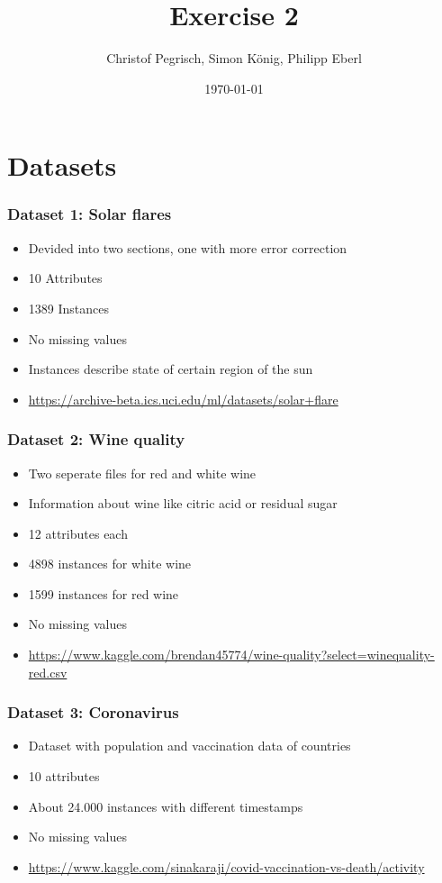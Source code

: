 \documentclass{beamer}
\title{Exercise 2}
\author{Christof Pegrisch, Simon König, Philipp Eberl}
\date{\today}
\begin{document}
\frame{\titlepage}


\section{Datasets}
\frame
{
  \frametitle{Dataset 1: Solar flares}

  \begin{itemize}
    \item Devided into two sections, one with more error correction
    \item 10 Attributes
    \item 1389 Instances
    \item No missing values
    \item Instances describe state of certain region of the sun
    \item \url{https://archive-beta.ics.uci.edu/ml/datasets/solar+flare}
  \end{itemize}
}

\frame
{
  \frametitle{Dataset 2: Wine quality}

  \begin{itemize}
    \item Two seperate files for red and white wine
    \item Information about wine like citric acid or residual sugar
    \item 12 attributes each
    \item 4898 instances for white wine
    \item 1599 instances for red wine
    \item No missing values
    \item \url{https://www.kaggle.com/brendan45774/wine-quality?select=winequality-red.csv}
  \end{itemize}
}

\frame
{
  \frametitle{Dataset 3: Coronavirus}

  \begin{itemize}
    \item Dataset with population and vaccination data of countries
    \item 10 attributes
    \item About 24.000 instances with different timestamps
    \item No missing values
    \item \url{https://www.kaggle.com/sinakaraji/covid-vaccination-vs-death/activity}
  \end{itemize}
}
\end{document}
